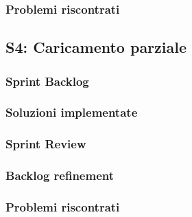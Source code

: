 \subsubsection{Problemi riscontrati}

\subsection{S4: Caricamento parziale}
\subsubsection{Sprint Backlog}
\subsubsection{Soluzioni implementate}
\subsubsection{Sprint Review}
\subsubsection{Backlog refinement}
\subsubsection{Problemi riscontrati}

